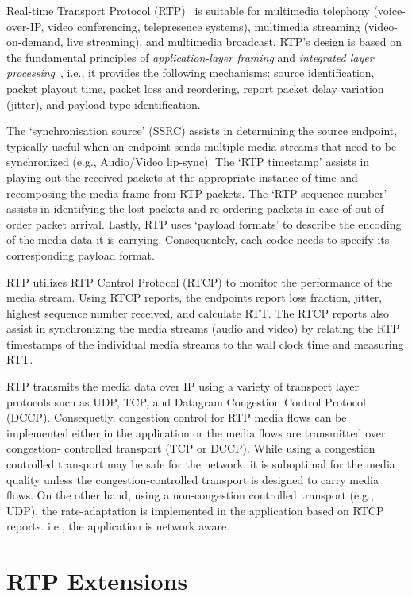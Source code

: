 
Real-time Transport Protocol (RTP)~\cite{rfc3550} is suitable for multimedia
telephony (voice-over-IP, video conferencing, telepresence systems),
multimedia streaming (video-on-demand, live streaming), and multimedia
broadcast. RTP's design is based on the fundamental principles of \textit
{application-layer framing} and \textit{integrated layer
processing}~\cite{clark:alf}, i.e., it provides the following mechanisms:
source identification, packet playout time, packet loss and reordering, report
packet delay variation (jitter), and payload type identification. 

The `synchronisation source' (SSRC) assists in determining the source
endpoint, typically useful when an endpoint sends multiple media streams that
need to be synchronized (e.g., Audio/Video lip-sync). The `RTP timestamp'
assists in playing out the received packets at the appropriate instance of
time and recomposing the media frame from RTP packets. The `RTP sequence
number' assists in identifying the lost packets and re-ordering packets in
case of out-of-order packet arrival. Lastly, RTP uses `payload formats' to
describe the encoding of the media data it is carrying. Consequentely,
each codec needs to specify its corresponding payload format.

RTP utilizes RTP Control Protocol (RTCP) to monitor the performance of the
media stream. Using RTCP reports, the endpoints report loss fraction, jitter,
highest sequence number received, and calculate RTT. The RTCP reports also
assist in synchronizing the media streams (audio and video) by relating the
RTP timestamps of the individual media streams to the wall clock time and
measuring RTT.


RTP transmits the media data over IP using a variety of transport layer
protocols such as UDP, TCP, and Datagram Congestion Control Protocol (DCCP).
Consequetly, congestion control for RTP media flows can be implemented either
in the application or the media flows are transmitted over congestion-
controlled transport (TCP or DCCP). While using a congestion controlled
transport may be safe for the network, it is suboptimal for the media quality
unless the congestion-controlled transport is designed to carry media flows.
On the other hand, using a non-congestion controlled transport (e.g., UDP),
the rate-adaptation is implemented in the application based on RTCP reports.
i.e., the application is network aware.




\section{RTP Extensions}
\label{rtp.ext}
